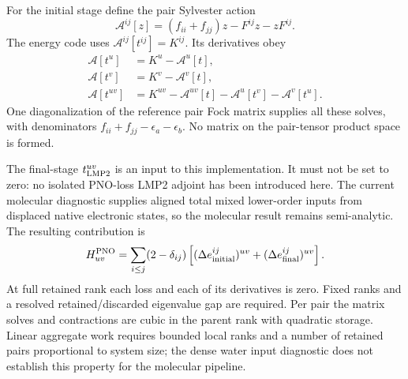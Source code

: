 \documentclass[11pt]{article}
\begin{document}
For the initial stage define the pair Sylvester action
\begin{equation}
 \mathcal A^{ij}[z]=(f_{ii}+f_{jj})z-F^{ij}z-zF^{ij}.
\end{equation}
The energy code uses $\mathcal A^{ij}[t^{ij}]=K^{ij}$. Its derivatives obey
\begin{align}
 \mathcal A[t^u]&=K^u-\mathcal A^u[t],\\
 \mathcal A[t^v]&=K^v-\mathcal A^v[t],\\
 \mathcal A[t^{uv}]&=K^{uv}-\mathcal A^{uv}[t]
                             -\mathcal A^u[t^v]-\mathcal A^v[t^u].
\end{align}
One diagonalization of the reference pair Fock matrix supplies all these
solves, with denominators $f_{ii}+f_{jj}-\epsilon_a-\epsilon_b$.
No matrix on the pair-tensor product space is formed.

The final-stage $t^{uv}_{\rm LMP2}$ is an input to this implementation.
It must not be set to zero: no isolated PNO-loss LMP2 adjoint has been
introduced here. The current molecular diagnostic supplies aligned total
mixed lower-order inputs from displaced native electronic states, so the
molecular result remains semi-analytic. The resulting contribution is
\begin{equation}
 H^{\rm PNO}_{uv}=\sum_{i\leq j}(2-\delta_{ij})
  \left[(\Delta e^{ij}_{\rm initial})^{uv}
                       +(\Delta e^{ij}_{\rm final})^{uv}\right].
\end{equation}
At full retained rank each loss and each of its derivatives is zero.
Fixed ranks and a resolved retained/discarded eigenvalue gap are required.
Per pair the matrix solves and contractions are cubic in the parent rank
with quadratic storage. Linear aggregate work requires bounded local ranks
and a number of retained pairs proportional to system size; the dense water
input diagnostic does not establish this property for the molecular pipeline.
\end{document}
